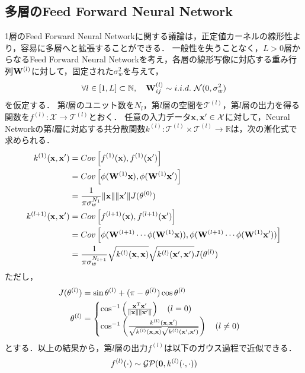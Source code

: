 \documentclass[11pt,a4j]{article}
\begin{document}
    \subsection{多層のFeed Forward Neural Network}
      1層のFeed Forward Neural Networkに関する議論は，正定値カーネルの線形性より，容易に多層へと拡張することができる．
      一般性を失うことなく，$L > 0$層からなるFeed Forward Neural Networkを考え，各層の線形写像に対応する重み行列${\bf W}^{(l)}$に対して，固定された$\sigma^2_w$を与えて，
      \begin{align}
        \forall l \in [1, L] \subset \mathbb{N}, ~~~ {\bf W}^{(l)}_{ij} \sim i.i.d. ~ \mathcal{N}(0, \sigma^2_w)
      \end{align}
      を仮定する．
      第$l$層のユニット数を$N_l$，第$l$層の空間を$\mathcal{T}^{(l)}$，第$l$層の出力を得る関数を$f^{(l)}: \mathcal{X} \to \mathcal{T}^{(l)}$とおく．
      任意の入力データ${\bf x}, {\bf x}' \in \mathcal{X}$に対して，Neural Networkの第$l$層に対応する共分散関数$k^{(l)}: \mathcal{T}^{(l)} \times \mathcal{T}^{(l)} \to \mathbb{R}$は，次の漸化式で求められる．
      \begin{align}
        k^{(1)}({\bf x}, {\bf x}') &= Cov \left[ f^{(1)}({\bf x}), f^{(1)}({\bf x}') \right] \nonumber \\
                                   &= Cov \left[ \phi({\bf W}^{(1)} {\bf x}), \phi({\bf W}^{(1)} {\bf x}') \right] \nonumber \\ 
                                   &= \frac{1}{\pi \sigma_w^{N_1}} \| {\bf x} \| \| {\bf x}' \| J(\theta^{(0)}) \\
        k^{(l+1)}({\bf x}, {\bf x}') &= Cov \left[ f^{(l+1)}({\bf x}), f^{(l+1)}({\bf x}') \right] \nonumber \\
                                     &= Cov \left[ \phi( {\bf W}^{(l+1)} \cdots \phi( {\bf W}^{(1)} {\bf x} )), \phi( {\bf W}^{(l+1)} \cdots \phi( {\bf W}^{(1)} {\bf x}' )) \right] \nonumber \\ 
                                     &= \frac{1}{ \pi \sigma_w^{N_{l+1}}} \sqrt{ k^{(l)}({\bf x}, {\bf x}) } \sqrt{ k^{(l)}({\bf x}', {\bf x}') } J(\theta^{(l)})
      \end{align}
      ただし，
      \begin{align}
        J(\theta^{(l)}) &= \sin \theta^{(l)} + (\pi - \theta^{(l)}) \cos \theta^{(l)} \\
        \theta^{(l)} &=
        \begin{cases}
          \cos^{-1} \left( \frac{{\bf x}^{\mathrm{T}} {\bf x}'}{ \|{\bf x}\| \|{\bf x}'\| } \right) ~~~ (l = 0) \\
          \cos^{-1} \left( \frac{k^{(l)}( {\bf x}, {\bf x}' )}{ \sqrt{ k^{(l)}({\bf x}, {\bf x}) } \sqrt{ k^{(l)}({\bf x}', {\bf x}') } } \right) ~~~ (l \neq 0) 
        \end{cases}
      \end{align}
      とする．以上の結果から，第$l$層の出力$f^{(l)}$は以下のガウス過程で近似できる．
      \begin{align}
        f^{(l)}(\cdot) \sim \mathcal{GP}( {\bf 0} , k^{(l)}(\cdot,\cdot) )
      \end{align}
\end{document}
